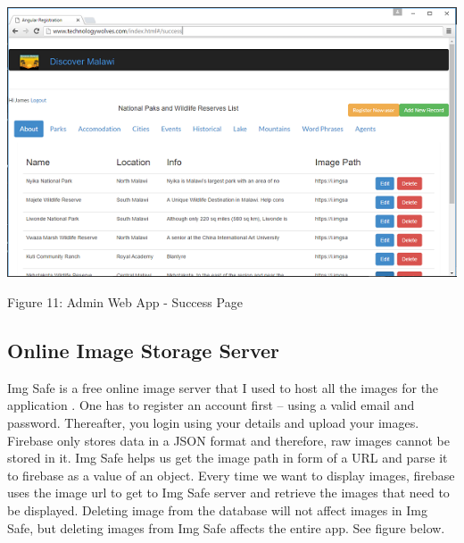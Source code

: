 \begin{center}    
	\includegraphics{img/success.png}
\end{center}
\begin{center}
	Figure 11: Admin Web App - Success Page
\end{center}
\paragraph{}

\subsection{Online Image Storage Server }
Img Safe is a free online image server that I used to host all the images for the application \cite{ImgSafe}.  One has to register an account first – using a valid email and password. Thereafter, you login using your details and upload your images. Firebase only stores data in a JSON format and therefore, raw images cannot be stored in it. Img Safe helps us get the image path in form of a URL and parse it to firebase as a value of an object. Every time we want to display images, firebase uses the image url to get to Img Safe server and retrieve the images that need to be displayed. Deleting image from the database will not affect images in Img Safe, but deleting images from Img Safe affects the entire app. See figure below.

